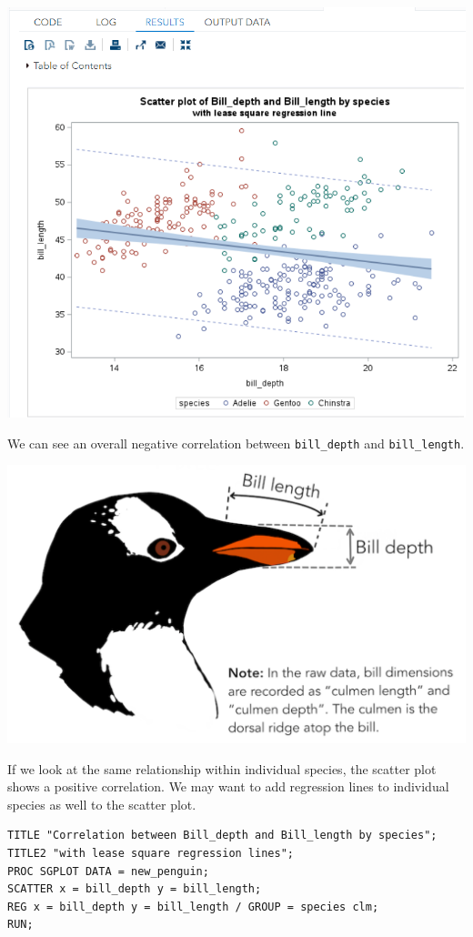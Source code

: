 \documentclass[
]{book}
\begin{document}
\begin{center}\includegraphics[width=1\linewidth]{img06/w06-ScatterReg} \end{center}

We can see an overall negative correlation between \texttt{bill\_depth} and \texttt{bill\_length}.

\begin{center}\includegraphics[width=0.5\linewidth]{img06/w06-penguinBill} \end{center}

If we look at the same relationship within individual species, the scatter plot shows a positive correlation. We may want to add regression lines to individual species as well to the scatter plot.

\begin{verbatim}
TITLE "Correlation between Bill_depth and Bill_length by species";
TITLE2 "with lease square regression lines";
PROC SGPLOT DATA = new_penguin;
SCATTER x = bill_depth y = bill_length;
REG x = bill_depth y = bill_length / GROUP = species clm;
RUN;
\end{verbatim}
\end{document}
